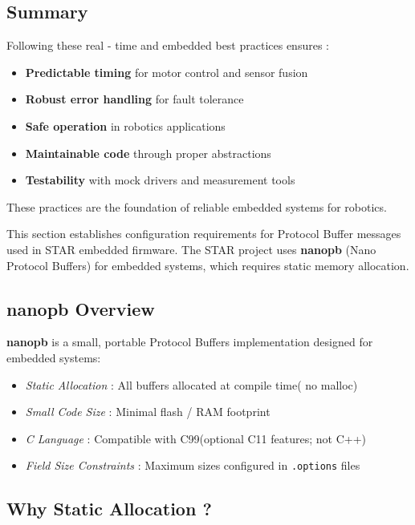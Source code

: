       \subsection{Summary}

          Following these real -
          time and embedded best practices ensures :
\begin{itemize}
      \item \textbf{Predictable timing} for
        motor control and sensor fusion
\item \textbf{Robust error handling} for fault tolerance
\item \textbf{Safe operation} in robotics applications
\item \textbf{Maintainable code} through proper abstractions
\item \textbf{Testability} with mock drivers and measurement tools
\end{itemize}

These practices are the foundation of reliable embedded systems for robotics.


This section establishes configuration requirements for Protocol Buffer messages used in STAR embedded firmware. The STAR project uses \textbf{nanopb} (Nano Protocol Buffers) for embedded systems, which requires static memory allocation.

\subsection{nanopb Overview
     }

\textbf{nanopb} is a small, portable Protocol Buffers implementation designed for embedded systems:

\begin{itemize}
\item \emph{Static Allocation} : All buffers allocated at compile time(
                                     no malloc)
  \item \emph{Small Code Size} : Minimal flash /
                                  RAM footprint
  \item \emph{C Language} : Compatible with C99(optional C11 features; not C++)
  \item \emph{Field Size Constraints}
    : Maximum sizes configured in \texttt{.options} files
\end{itemize}

\subsection{Why Static Allocation
            ?}

